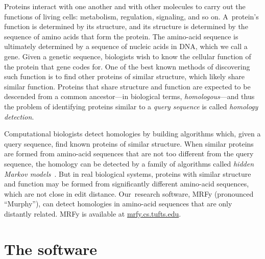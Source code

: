 \documentclass[nonatbib,preprint,blockstyle,times]{sigplanconf}
\newcommand\secref[1]{Section~\ref{sec:#1}}
\let\cite\citep
\begin{document}
Proteins %
interact with one another and with other 
molecules to carry out the functions of living cells: metabolism, regulation, 
signaling, and so on.
A~protein's function is determined by its structure, 
and its structure is determined by the sequence of amino acids that
form the protein.
The amino-acid sequence is ultimately determined by a sequence of
nucleic acids in DNA, which we call a gene.
Given a genetic sequence, biologists wish to know the cellular
function of the protein that gene codes for.
One of the best known methods of discovering such function is
to find other proteins of 
similar structure, which likely share similar function.
Proteins that share structure and function are expected to be
descended from a common ancestor---in biological terms, \emph{homologous}---and
thus
the problem of identifying proteins similar to a \textit{query sequence} is called 
\textit{homology detection}.




Computational biologists detect homologies by building 
algorithms which, given a {query sequence}, %
find known proteins of similar structure.
When similar proteins are formed from amino-acid sequences that
are not too different from the query sequence, the homology can be
detected by
a family of algorithms called 
\textit{hidden Markov models}~\cite{Eddy:1998ut}.
But in real biological systems,
proteins with similar structure and function may be formed from significantly 
different amino-acid sequences, which are not close in edit distance.
Our~research software, MRFy (pronounced
``Murphy''), can detect homologies 
in amino-acid sequences that are only distantly related.
MRFy is available at \url{mrfy.cs.tufts.edu}.
%
%

%
%
%


\section{The software}
\end{document}
